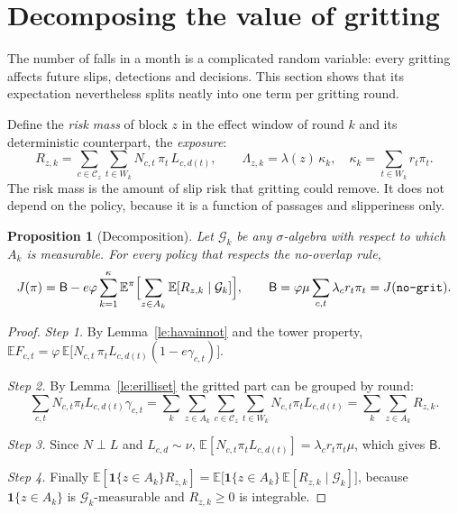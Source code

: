 \documentclass[11pt,a4paper]{article}
\theoremstyle{plain}
\newtheorem{propositio}{Proposition}
\theoremstyle{definition}
\theoremstyle{remark}
\newcommand{\E}{\mathbb{E}}
\newcommand{\cC}{\mathcal{C}}
\newcommand{\cG}{\mathcal{G}}
\newcommand{\1}{\mathbf{1}}
\newcommand{\pol}[1]{\texttt{#1}}
\begin{document}
\section{Decomposing the value of gritting}\label{sec:hajotelma}

The number of falls in a month is a complicated random variable: every gritting
affects future slips, detections and decisions. This section shows that its
expectation nevertheless splits neatly into one term per gritting round.

Define the \emph{risk mass} of block $z$ in the effect window of round $k$ and
its deterministic counterpart, the \emph{exposure}:
\[
  R_{z,k} = \sum_{c \in \cC_z} \sum_{t \in W_k} N_{c,t}\, \pi_t\, L_{c,d(t)},
  \qquad
  \Lambda_{z,k} = \lambda(z)\, \kappa_k, \quad \kappa_k = \sum_{t \in W_k} r_t \pi_t .
\]
The risk mass is the amount of slip risk that gritting could remove. It does not
depend on the policy, because it is a function of passages and slipperiness only.

\begin{propositio}[Decomposition]\label{pr:hajotelma}
Let $\cG_k$ be any $\sigma$-algebra with respect to which $A_k$ is measurable.
For every policy that respects the no-overlap rule,
\[
  J(\pi) = \mathsf{B} - e \varphi \sum_{k=1}^{\kappa}
  \E^\pi\Bigl[\sum_{z \in A_k} \E[R_{z,k} \mid \cG_k]\Bigr],
  \qquad
  \mathsf{B} = \varphi \mu \sum_{c,t} \lambda_c r_t \pi_t = J(\pol{no-grit}).
\]
\end{propositio}

\begin{proof}
\emph{Step 1.} By Lemma~\ref{le:havainnot} and the tower property,
$\E F_{c,t} = \varphi\,\E\bigl[N_{c,t}\, \pi_t L_{c,d(t)} (1 - e\gamma_{c,t})\bigr]$.

\emph{Step 2.} By Lemma~\ref{le:erilliset} the gritted part can be grouped by
round:
\[
  \sum_{c,t} N_{c,t}\pi_t L_{c,d(t)} \gamma_{c,t}
  = \sum_k \sum_{z \in A_k} \sum_{c \in \cC_z} \sum_{t \in W_k} N_{c,t}\pi_t L_{c,d(t)}
  = \sum_k \sum_{z \in A_k} R_{z,k}.
\]

\emph{Step 3.} Since $N \perp L$ and $L_{c,d} \sim \nu$,
$\E[N_{c,t}\pi_t L_{c,d(t)}] = \lambda_c r_t \pi_t \mu$, which gives $\mathsf{B}$.

\emph{Step 4.} Finally
$\E[\1\{z \in A_k\} R_{z,k}] = \E\bigl[\1\{z \in A_k\}\,\E[R_{z,k} \mid \cG_k]\bigr]$,
because $\1\{z \in A_k\}$ is $\cG_k$-measurable and $R_{z,k} \ge 0$ is integrable.
\end{proof}
\end{document}

